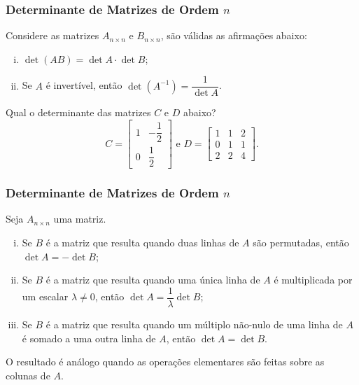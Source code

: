 \begin{frame}
    \frametitle{Determinante de Matrizes de Ordem $n$}

    
    \begin{proposicao}[Propriedades]
        Considere as matrizes $A_{n \times n}$ e $B_{n \times n}$, são válidas as afirmações abaixo:
        \begin{enumerate}[i)]
            \item $\det (AB) = \det A \cdot \det B$;
            \item Se $A$ é invertível, então $\det (A^{-1}) = \dfrac 1 {\det A}$.
        \end{enumerate}
    \end{proposicao}\pause

 
    
    \begin{exemplo}
        Qual o determinante das matrizes $C$ e $D$ abaixo?
        \begin{displaymath} C = 
            \begin{bmatrix}
                1 & -\dfrac {1} 2 \\
                0 & \dfrac 1 2
            \end{bmatrix}
        \text{ e } D = 
            \begin{bmatrix}
                1 & 1 & 2 \\
                0 & 1 & 1 \\
                2 & 2 & 4 
            \end{bmatrix}.
        \end{displaymath}
    \end{exemplo}
\end{frame}


\begin{frame}
    \frametitle{Determinante de Matrizes de Ordem $n$}

    
    \begin{proposicao}
        Seja $A_{n \times n}$ uma matriz.
        \begin{enumerate}[i)]
            \item Se $B$ é a matriz que resulta quando duas linhas de $A$ são permutadas, então $\det A = - \det B$;
            \item Se $B$ é a matriz que resulta quando uma única linha de $A$ é multiplicada por um escalar $\lambda \neq 0$, então $\det A = \dfrac 1 \lambda \det B$;
            \item Se $B$ é a matriz que resulta quando um múltiplo não-nulo de uma linha de $A$ é somado a uma outra linha de $A$, então $\det A = \det B$.
        \end{enumerate}
        O resultado é análogo quando as operações elementares são feitas sobre as colunas de $A$.
    \end{proposicao}
\end{frame}


